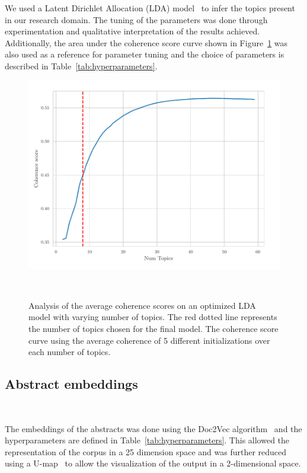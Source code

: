 \documentclass[parskip=full]{scrartcl}
\begin{document}
We used a Latent Dirichlet Allocation (LDA) model~\cite{Pritchard2000} to
infer the topics present in our research domain. The tuning of the parameters
was done through experimentation and qualitative interpretation of the results
achieved. Additionally, the area under the coherence score curve shown in
Figure~\ref{fig:lda_coherence_analysis} was also used as a reference for
parameter tuning and the choice of parameters is described in
Table~\ref{tab:hyperparameters}. 

\begin{figure}[H]
	\centering
    \includegraphics[width=.9\linewidth]{../analysis/lda_coherence_analysis}
    \caption{%
        Analysis of the average coherence scores on an optimized LDA model
        with varying number of topics. The red dotted line represents the
        number of topics chosen for the final model. The coherence score curve
        using the average coherence of 5 different initializations over each
        number of topics.
    }~\label{fig:lda_coherence_analysis}
\end{figure}

\subsection{Abstract embeddings}~\label{sec:abstract_embeddings}

The embeddings of the abstracts was done using the Doc2Vec
algorithm~\cite{Le2014} and the hyperparameters are defined in
Table~\ref{tab:hyperparameters}. This allowed the representation of the corpus
in a 25 dimension space and was further reduced using a
U-map~\cite{Mcinnes2018} to allow the visualization of the output in a
2-dimensional space.
\end{document}
